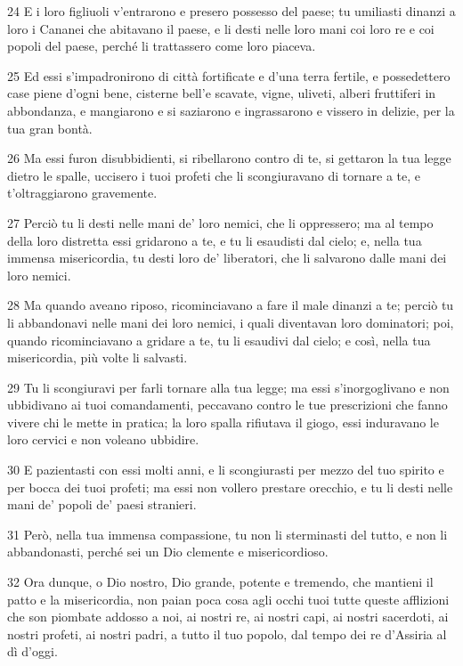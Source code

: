 \par 24 E i loro figliuoli v'entrarono e presero possesso del paese; tu umiliasti dinanzi a loro i Cananei che abitavano il paese, e li desti nelle loro mani coi loro re e coi popoli del paese, perché li trattassero come loro piaceva.
\par 25 Ed essi s'impadronirono di città fortificate e d'una terra fertile, e possedettero case piene d'ogni bene, cisterne bell'e scavate, vigne, uliveti, alberi fruttiferi in abbondanza, e mangiarono e si saziarono e ingrassarono e vissero in delizie, per la tua gran bontà.
\par 26 Ma essi furon disubbidienti, si ribellarono contro di te, si gettaron la tua legge dietro le spalle, uccisero i tuoi profeti che li scongiuravano di tornare a te, e t'oltraggiarono gravemente.
\par 27 Perciò tu li desti nelle mani de' loro nemici, che li oppressero; ma al tempo della loro distretta essi gridarono a te, e tu li esaudisti dal cielo; e, nella tua immensa misericordia, tu desti loro de' liberatori, che li salvarono dalle mani dei loro nemici.
\par 28 Ma quando aveano riposo, ricominciavano a fare il male dinanzi a te; perciò tu li abbandonavi nelle mani dei loro nemici, i quali diventavan loro dominatori; poi, quando ricominciavano a gridare a te, tu li esaudivi dal cielo; e così, nella tua misericordia, più volte li salvasti.
\par 29 Tu li scongiuravi per farli tornare alla tua legge; ma essi s'inorgoglivano e non ubbidivano ai tuoi comandamenti, peccavano contro le tue prescrizioni che fanno vivere chi le mette in pratica; la loro spalla rifiutava il giogo, essi induravano le loro cervici e non voleano ubbidire.
\par 30 E pazientasti con essi molti anni, e li scongiurasti per mezzo del tuo spirito e per bocca dei tuoi profeti; ma essi non vollero prestare orecchio, e tu li desti nelle mani de' popoli de' paesi stranieri.
\par 31 Però, nella tua immensa compassione, tu non li sterminasti del tutto, e non li abbandonasti, perché sei un Dio clemente e misericordioso.
\par 32 Ora dunque, o Dio nostro, Dio grande, potente e tremendo, che mantieni il patto e la misericordia, non paian poca cosa agli occhi tuoi tutte queste afflizioni che son piombate addosso a noi, ai nostri re, ai nostri capi, ai nostri sacerdoti, ai nostri profeti, ai nostri padri, a tutto il tuo popolo, dal tempo dei re d'Assiria al dì d'oggi.
